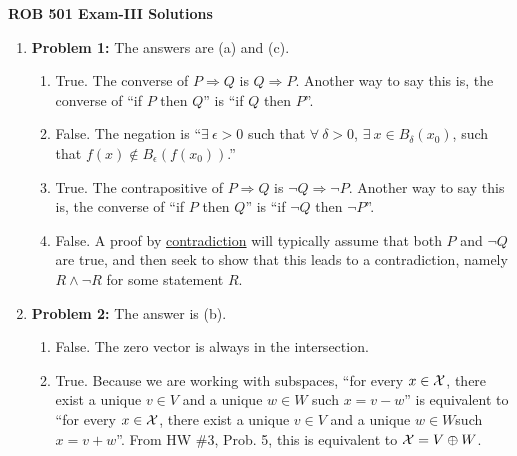 \documentclass[letterpaper]{article}
\begin{document}
\newcommand{\trace}{\mathrm{trace}}
\newcommand{\real}{\mathbb R}  %
\newcommand{\nat}{\mathbb R}   %
\newcommand{\cp}{\mathbb C}    %
\newcommand{\ds}{\displaystyle}
\newcommand{\mf}[2]{\frac{\ds #1}{\ds #2}}
\newcommand{\book}[2]{{Luenberger, Page~#1, }{Prob.~#2}}
\newcommand{\spanof}[1]{\textrm{span} \{ #1 \}}
  \newcommand{\Covof}[2]{ \mathrm{cov} \left(#1,#2\right)}
\parindent 0pt


\begin{center}
{\large \bf ROB 501 Exam-III Solutions}
\end{center}

\vspace*{1cm}

\begin{enumerate}
\item \noindent \textbf{Problem 1:}
The answers are (a) and (c).
\begin{enumerate}
\setlength{\itemsep}{.1in}
\renewcommand{\labelenumi}{(\alph{enumi})}
\item True. The converse of $P \Rightarrow Q$ is $Q \Rightarrow P$. Another way to say this is, the converse of ``if $P$ then $Q$'' is ``if $Q$ then $P$''.

\item False. The negation is ``$\exists~\epsilon>0$ such that $\forall ~ \delta>0$,  $ \exists~x \in B_{\delta}(x_0)$, such that $f(x) \not \in B_\epsilon(f(x_0))$.''

\item True. The contrapositive of  $P \Rightarrow Q$ is $\neg Q \Rightarrow \neg P$. Another way to say this is, the converse of ``if $P$ then $Q$'' is ``if $\neg Q$ then $\neg P$''.

\item False. A proof by \underline{contradiction} will typically assume that both $P$ and $\neg Q$ are true, and then seek to show that this leads to a contradiction, namely $R\land \neg R$ for some statement $R$.
\end{enumerate}

\item \noindent \textbf{Problem 2:}
The answer is (b).
\begin{enumerate}
\setlength{\itemsep}{.1in}
\renewcommand{\labelenumi}{(\alph{enumi})}
\item False. The zero vector is always in the intersection.

\item True. Because we are working with subspaces, ``for every $x\in {\cal X}$, there exist a unique $v\in V$ and a unique $ w \in W$ such $x=v-w$'' is equivalent to ``for every $x\in {\cal X}$, there exist a unique $v\in V$ and a unique $ w \in W$such $x=v+w$''. From HW \#3, Prob. 5, this is equivalent to ${\cal X} =V \oplus W$.


\end{enumerate}
\end{enumerate}
\end{document}
